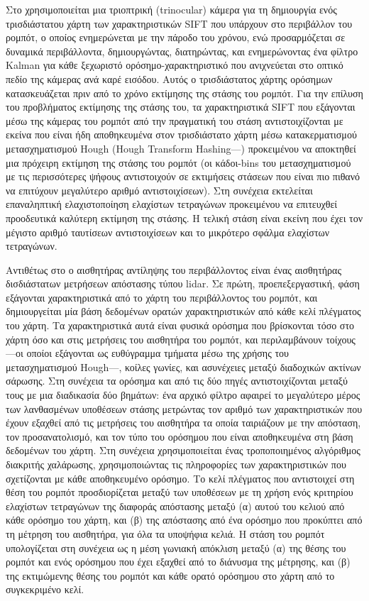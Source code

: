 Στο \cite{Se} χρησιμοποιείται μια τριοπτρική (trinocular) κάμερα για τη
δημιουργία ενός τρισδιάστατου χάρτη των χαρακτηριστικών SIFT που υπάρχουν στο
περιβάλλον του ρομπότ, ο οποίος ενημερώνεται με την πάροδο του χρόνου, ενώ
προσαρμόζεται σε δυναμικά περιβάλλοντα, δημιουργώντας, διατηρώντας, και
ενημερώνοντας ένα φίλτρο Kalman για κάθε ξεχωριστό ορόσημο-χαρακτηριστικό που
ανιχνεύεται στο οπτικό πεδίο της κάμερας ανά καρέ εισόδου. Αυτός ο
τρισδιάστατος χάρτης ορόσημων κατασκευάζεται πριν από το χρόνο εκτίμησης της
στάσης του ρομπότ. Για την επίλυση του προβλήματος εκτίμησης της στάσης του, τα
χαρακτηριστικά SIFT που εξάγονται μέσω της κάμερας του ρομπότ από την πραγματική
του στάση αντιστοιχίζονται με εκείνα που είναι ήδη αποθηκευμένα στον τρισδιάστατο
χάρτη μέσω κατακερματισμού μετασχηματισμού Hough (Hough Transform
Hashing---\cite{Hough1960}) προκειμένου να αποκτηθεί μια πρόχειρη εκτίμηση της
στάσης του ρομπότ (οι κάδοι-bins του μετασχηματισμού με τις περισσότερες ψήφους
αντιστοιχούν σε εκτιμήσεις στάσεων που είναι πιο πιθανό να επιτύχουν μεγαλύτερο
αριθμό αντιστοιχίσεων). Στη συνέχεια εκτελείται επαναληπτική ελαχιστοποίηση
ελαχίστων τετραγώνων προκειμένου να επιτευχθεί προοδευτικά καλύτερη εκτίμηση
της στάσης. Η τελική στάση είναι εκείνη που έχει τον μέγιστο αριθμό ταυτίσεων
αντιστοιχίσεων και το μικρότερο σφάλμα ελαχίστων τετραγώνων.

Αντιθέτως στο \cite{Hernandez-alamilla2006} ο αισθητήρας αντίληψης του
περιβάλλοντος είναι ένας αισθητήρας δισδιάστατων μετρήσεων απόστασης τύπου
lidar. Σε πρώτη, προεπεξεργαστική, φάση εξάγονται χαρακτηριστικά από το χάρτη
του περιβάλλοντος του ρομπότ, και δημιουργείται μία βάση δεδομένων ορατών
χαρακτηριστικών από κάθε κελί πλέγματος του χάρτη. Τα χαρακτηριστικά αυτά είναι
φυσικά ορόσημα που βρίσκονται τόσο στο χάρτη όσο και στις μετρήσεις του
αισθητήρα του ρομπότ, και περιλαμβάνουν τοίχους---οι οποίοι εξάγονται ως
ευθύγραμμα τμήματα μέσω της χρήσης του μετασχηματισμού Hough---, κοίλες γωνίες,
και ασυνέχειες μεταξύ διαδοχικών ακτίνων σάρωσης. Στη συνέχεια τα ορόσημα και
από τις δύο πηγές αντιστοιχίζονται μεταξύ τους με μια διαδικασία δύο βημάτων:
ένα αρχικό φίλτρο αφαιρεί το μεγαλύτερο μέρος των λανθασμένων υποθέσεων στάσης
μετρώντας τον αριθμό των χαρακτηριστικών που έχουν εξαχθεί από τις μετρήσεις
του αισθητήρα τα οποία ταιριάζουν με την απόσταση, τον προσανατολισμό, και τον
τύπο του ορόσημου που είναι αποθηκευμένα στη βάση δεδομένων του χάρτη. Στη
συνέχεια χρησιμοποιείται ένας τροποποιημένος αλγόριθμος διακριτής χαλάρωσης,
χρησιμοποιώντας τις πληροφορίες των χαρακτηριστικών που σχετίζονται με κάθε
αποθηκευμένο ορόσημο. Το κελί πλέγματος που αντιστοιχεί στη θέση του ρομπότ
προσδιορίζεται μεταξύ των υποθέσεων με τη χρήση ενός κριτηρίου ελαχίστων
τετραγώνων της διαφοράς απόστασης μεταξύ (α) αυτού του κελιού από κάθε ορόσημο
του χάρτη, και (β) της απόστασης από ένα ορόσημο που προκύπτει από τη μέτρηση
του αισθητήρα, για όλα τα υποψήφια κελιά.  Η στάση του ρομπότ υπολογίζεται στη
συνέχεια ως η μέση γωνιακή απόκλιση μεταξύ (α) της θέσης του ρομπότ και ενός
ορόσημου που έχει εξαχθεί από το διάνυσμα της μέτρησης, και (β) της εκτιμώμενης
θέσης του ρομπότ και κάθε ορατό ορόσημου στο χάρτη από το συγκεκριμένο κελί.

